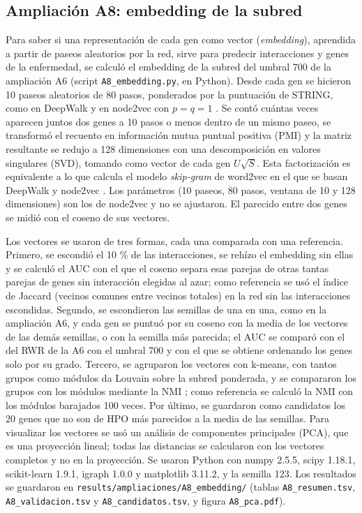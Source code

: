 \subsection{Ampliación A8: embedding de la subred}

Para saber si una representación de cada gen como vector (\textit{embedding}), aprendida a partir de paseos aleatorios por la red, sirve para predecir interacciones y genes de la enfermedad, se calculó el embedding de la subred del umbral 700 de la ampliación A6 (script \texttt{A8\_embedding.py}, en Python). Desde cada gen se hicieron 10 paseos aleatorios de 80 pasos, ponderados por la puntuación de STRING, como en DeepWalk \cite{Perozzi2014} y en node2vec con $p = q = 1$ \cite{Grover2016}. Se contó cuántas veces aparecen juntos dos genes a 10 pasos o menos dentro de un mismo paseo, se transformó el recuento en información mutua puntual positiva (PMI) y la matriz resultante se redujo a 128 dimensiones con una descomposición en valores singulares (SVD), tomando como vector de cada gen $U\sqrt{S}$. Esta factorización es equivalente a lo que calcula el modelo \textit{skip-gram} de word2vec en el que se basan DeepWalk y node2vec \cite{Levy2014,Qiu2018}. Los parámetros (10 paseos, 80 pasos, ventana de 10 y 128 dimensiones) son los de node2vec y no se ajustaron. El parecido entre dos genes se midió con el coseno de sus vectores.

Los vectores se usaron de tres formas, cada una comparada con una referencia. Primero, se escondió el 10 \% de las interacciones, se rehízo el embedding sin ellas y se calculó el AUC con el que el coseno separa esas parejas de otras tantas parejas de genes sin interacción elegidas al azar; como referencia se usó el índice de Jaccard (vecinos comunes entre vecinos totales) en la red sin las interacciones escondidas. Segundo, se escondieron las semillas de una en una, como en la ampliación A6, y cada gen se puntuó por su coseno con la media de los vectores de las demás semillas, o con la semilla más parecida; el AUC se comparó con el del RWR de la A6 con el umbral 700 y con el que se obtiene ordenando los genes solo por su grado. Tercero, se agruparon los vectores con k-means, con tantos grupos como módulos da Louvain sobre la subred ponderada, y se compararon los grupos con los módulos mediante la NMI \cite{Danon2005}; como referencia se calculó la NMI con los módulos barajados 100 veces. Por último, se guardaron como candidatos los 20 genes que no son de HPO más parecidos a la media de las semillas. Para visualizar los vectores se usó un análisis de componentes principales (PCA), que es una proyección lineal; todas las distancias se calcularon con los vectores completos y no en la proyección. Se usaron Python con numpy 2.5.5, scipy 1.18.1, scikit-learn 1.9.1, igraph 1.0.0 y matplotlib 3.11.2, y la semilla 123. Los resultados se guardaron en \texttt{results/ampliaciones/A8\_embedding/} (tablas \texttt{A8\_resumen.tsv}, \texttt{A8\_validacion.tsv} y \texttt{A8\_candidatos.tsv}, y figura \texttt{A8\_pca.pdf}).

